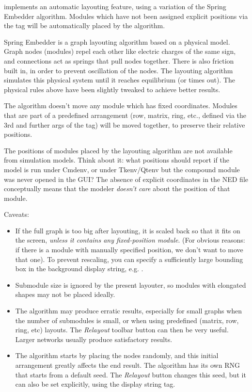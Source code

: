 {\opp} implements an automatic layouting feature, using a variation of the
Spring Embedder algorithm. Modules which have not been assigned explicit
positions via the  tag will be automatically placed by the
algorithm.

Spring Embedder is a graph layouting algorithm based on a physical model.
Graph nodes (modules) repel each other like electric charges of the same
sign, and connections act as springs that pull nodes together. There is
also friction built in, in order to prevent oscillation of the nodes. The
layouting algorithm simulates this physical system until it reaches
equilibrium (or times out). The physical rules above have been slightly
tweaked to achieve better results.

The algorithm doesn't move any module which has fixed coordinates. Modules
that are part of a predefined arrangement (row, matrix, ring, etc., defined
via the 3rd and further args of the  tag) will be moved together,
to preserve their relative positions.

\begin{note}
The positions of modules placed by the layouting algorithm are not
available from simulation models. Think about it: what positions should
{\opp} report if the model is run under Cmdenv, or under Tkenv/Qtenv but
the compound module was never opened in the GUI? The absence of explicit
coordinates in the NED file conceptually means that the modeler
\textit{doesn't care} about the position of that module.
\end{note}

Caveats:

\begin{itemize}
  \item If the full graph is too big after layouting, it is scaled
    back so that it fits on the screen, \textit{unless it contains
    any fixed-position module}. (For obvious reasons: if there is a module
    with manually specified position, we don't want to move that one).
    To prevent rescaling, you can specify a sufficiently large bounding
    box in the background display string, e.g. .
  \item Submodule size is ignored by the present layouter, so modules
    with elongated shapes may not be placed ideally.
  \item The algorithm may produce erratic results, especially for small graphs
    when the number of submodules is small, or when using predefined
    (matrix, row, ring, etc) layouts. The \textit{Relayout} toolbar button
    can then be very useful. Larger networks usually produce
    satisfactory results.
  \item The algorithm starts by placing the nodes randomly, and this initial
    arrangement greatly affects the end result. The algorithm has its
    own RNG that starts from a default seed. The \textit{Relayout} button
    changes this seed, but it can also be set explicitly, using the
     display string tag.
\end{itemize}


